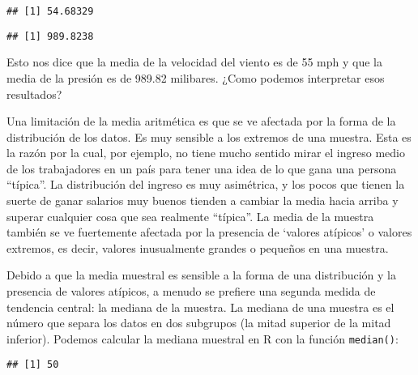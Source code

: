 \documentclass[
]{book}
\newenvironment{Shaded}{\begin{snugshade}}{\end{snugshade}}
\newcommand{\FunctionTok}[1]{\textcolor[rgb]{0.00,0.00,0.00}{#1}}
\newcommand{\NormalTok}[1]{#1}
\newcommand{\SpecialCharTok}[1]{\textcolor[rgb]{0.00,0.00,0.00}{#1}}
\begin{document}
\begin{verbatim}
## [1] 54.68329
\end{verbatim}

\begin{Shaded}
\end{Shaded}

\begin{verbatim}
## [1] 989.8238
\end{verbatim}

Esto nos dice que la media de la velocidad del viento es de 55 mph y que la media de la presión es de 989.82 milibares. ¿Como podemos interpretar esos resultados?

Una limitación de la media aritmética es que se ve afectada por la forma de la distribución de los datos. Es muy sensible a los extremos de una muestra. Esta es la razón por la cual, por ejemplo, no tiene mucho sentido mirar el ingreso medio de los trabajadores en un país para tener una idea de lo que gana una persona ``típica''. La distribución del ingreso es muy asimétrica, y los pocos que tienen la suerte de ganar salarios muy buenos tienden a cambiar la media hacia arriba y superar cualquier cosa que sea realmente ``típica''. La media de la muestra también se ve fuertemente afectada por la presencia de `valores atípicos' o valores extremos, es decir, valores inusualmente grandes o pequeños en una muestra.

Debido a que la media muestral es sensible a la forma de una distribución y la presencia de valores atípicos, a menudo se prefiere una segunda medida de tendencia central: la mediana de la muestra. La mediana de una muestra es el número que separa los datos en dos subgrupos (la mitad superior de la mitad inferior). Podemos calcular la mediana muestral en R con la función \texttt{median()}:

\begin{Shaded}
\end{Shaded}

\begin{verbatim}
## [1] 50
\end{verbatim}

\begin{Shaded}
\end{Shaded}
\end{document}
